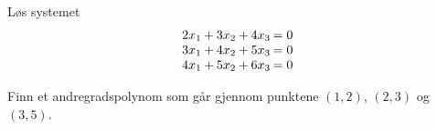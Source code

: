 \begin{oppgave}{5}
Løs systemet
\[
\setlength\arraycolsep{1pt}
\begin{array}{rcrcrc@{\;}l}
  2x_1   & + &   3x_2   & + &      4x_3  &  =   &  0 \\
   3x_1   & + &  4x_2   & + &       5x_3   &  =   &  0 \\
  4x_1   &  + &    5 x_2   &  + &   6x_3   &  =   &  0 
\end{array}
\]
\end{oppgave}

\begin{oppgave}{6}
Finn et andregradspolynom som går gjennom punktene $(1,2)$, $(2,3)$ og $(3,5)$.
\end{oppgave}


